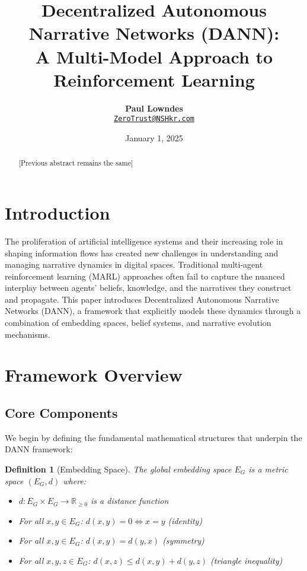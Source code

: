 \documentclass[12pt, a4paper]{article}
\title{\vspace{-2cm}\textbf{Decentralized Autonomous Narrative Networks (DANN): \\ A Multi-Model Approach to Reinforcement Learning}}
\author{\textbf{Paul Lowndes} \\ \href{mailto:ZeroTrust@NSHkr.com}{\texttt{ZeroTrust@NSHkr.com}}}
\date{\small January 1, 2025}
\newtheorem{definition}{Definition}
\begin{document}
\maketitle
\vspace{-1.5em}

\begin{abstract}
[Previous abstract remains the same]
\end{abstract}

\section{Introduction}
The proliferation of artificial intelligence systems and their increasing role in shaping information flows has created new challenges in understanding and managing narrative dynamics in digital spaces. Traditional multi-agent reinforcement learning (MARL) approaches often fail to capture the nuanced interplay between agents' beliefs, knowledge, and the narratives they construct and propagate. This paper introduces Decentralized Autonomous Narrative Networks (DANN), a framework that explicitly models these dynamics through a combination of embedding spaces, belief systems, and narrative evolution mechanisms.

\section{Framework Overview}
\subsection{Core Components}
We begin by defining the fundamental mathematical structures that underpin the DANN framework:

\begin{definition}[Embedding Space]
The global embedding space $E_G$ is a metric space $(E_G, d)$ where:
\begin{itemize}
    \item $d: E_G \times E_G \rightarrow \mathbb{R}_{\geq 0}$ is a distance function
    \item For all $x,y \in E_G$: $d(x,y) = 0 \iff x = y$ (identity)
    \item For all $x,y \in E_G$: $d(x,y) = d(y,x)$ (symmetry)
    \item For all $x,y,z \in E_G$: $d(x,z) \leq d(x,y) + d(y,z)$ (triangle inequality)
\end{itemize}
\end{definition}
\end{document}
